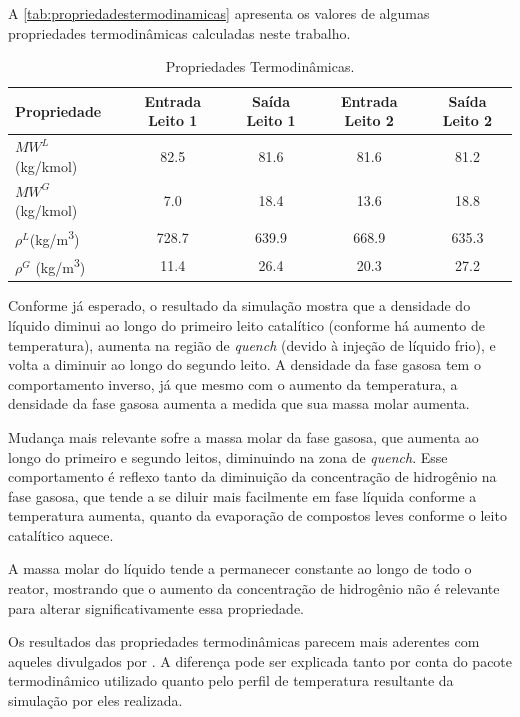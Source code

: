 A \autoref{tab:propriedadestermodinamicas} apresenta os valores de algumas
propriedades termodinâmicas calculadas neste trabalho.

\begin{table}[!htb]
\begin{center}
\caption{Propriedades Termodinâmicas.}
\label{tab:propriedadestermodinamicas}
\small
\begin{tabular}{lcccc}
{Propriedade} & {Entrada Leito 1} & {Saída Leito 1} & {Entrada Leito 2} &
{Saída Leito 2}
\\
\hline
{$MW^{L}$ (\si{kg/kmol})} & \num{82,5} & \num{81,6} & \num{81,6} & \num{81,2} \\
{$MW^{G}$ (\si{kg/kmol})} & \num{7,0} & \num{18,4} & \num{13,6} & \num{18,8} \\
{$\rho^{L}$(\si{kg/m^3})} & \num{728,7} & \num{639,9} & \num{668,9} &
\num{635,3}
\\
{$\rho^{G}$ (\si{kg/m^3})} & \num{11,4} & \num{26,4} & \num{20,3} & \num{27,2}
\\
\bottomrule
\end{tabular}
\end{center}
\end{table}

Conforme já esperado, o resultado da simulação mostra que a densidade do
líquido diminui ao longo do primeiro leito catalítico (conforme há aumento de
temperatura), aumenta na região de \emph{quench} (devido à injeção de líquido
frio), e volta a diminuir ao longo do segundo leito. A densidade da fase gasosa
tem o comportamento inverso, já que mesmo com o aumento da temperatura, a
densidade da fase gasosa aumenta a medida que sua massa molar aumenta.

Mudança mais relevante sofre a massa molar da fase gasosa, que aumenta ao
longo do primeiro e segundo leitos, diminuindo na zona de \emph{quench}. Esse
comportamento é reflexo tanto da diminuição da concentração de hidrogênio na
fase gasosa, que tende a se diluir mais facilmente em fase líquida conforme a
temperatura aumenta, quanto da evaporação de compostos leves conforme o leito
catalítico aquece.

A massa molar do líquido tende a permanecer constante ao longo de todo o
reator, mostrando que o aumento da concentração de hidrogênio não é relevante
para alterar significativamente essa propriedade.

Os resultados das propriedades termodinâmicas parecem mais aderentes com
aqueles divulgados por . A diferença pode ser explicada
tanto por conta do pacote termodinâmico utilizado quanto pelo perfil de
temperatura resultante da simulação por eles realizada.

